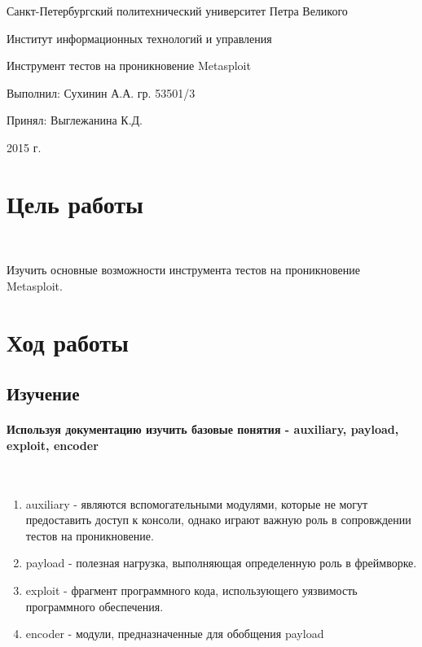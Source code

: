 \documentclass{article}
\begin{document}
\begin{titlepage} \begin{center}

	\Large			
Санкт-Петербургский политехнический университет Петра Великого
			
	\vspace{0.2cm}	
Институт информационных технологий и управления
		
	\vspace{2cm} \vfill \huge
Инструмент тестов на проникновение Metasploit
		
	\vfill 
	\begin{flushleft} \large \hangindent=8cm 
Выполнил: Сухинин А.А. гр. 53501/3 \hrulefill
			
Принял: Выглежанина К.Д. \hrulefill
	\end{flushleft}
		
	\vspace{2cm} \vfill \LARGE
2015 г.
		
\end{center} \end{titlepage}

\section{Цель работы}
~

Изучить основные возможности инструмента тестов на проникновение Metasploit.

\section{Ход работы}

\subsection{Изучение}

\paragraph{Используя документацию изучить базовые понятия - auxiliary, payload, exploit, encoder}
~

\begin{enumerate}
\item auxiliary - являются вспомогательными модулями, которые не могут предоставить доступ к консоли, однако играют важную роль в сопровждении тестов на проникновение.

\item payload - полезная нагрузка, выполняющая определенную роль в фреймворке.

\item exploit - фрагмент программного кода, использующего уязвимость программного обеспечения.

\item encoder - модули, предназначенные для обобщения payload
\end{enumerate}
\end{document}
